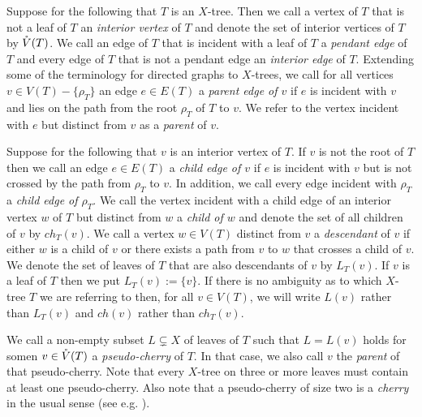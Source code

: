 Suppose for the following that $T$ is an $X$-tree. Then we call a vertex of
$T$ that is not a leaf of $T$ an {\em interior vertex} of $T$ and denote the
set of interior vertices of $T$ by $\mathring{V}(T)$.  We call an edge of $T$ that is
incident with a leaf of $T$ a {\em pendant edge} of $T$ and every edge of $T$
that is not a pendant edge an {\em interior edge} of $T$.  Extending some of
the terminology for directed graphs to $X$-trees, we call for all vertices
$v\in V(T)-\{\rho_T\}$ an edge $e\in E(T)$ a {\em parent edge of $v$} if $e$
is incident with $v$ and lies on the path from the root $\rho_T$ of $T$ to
$v$. We refer to the vertex incident with $e$ but distinct from $v$ as a {\em
  parent} of $v$.
 
Suppose for the following that $v$ is an interior vertex of $T$. If $v$ is not
the root of $T$ then we call an edge $e\in E(T)$ a {\em child edge of $v$} if
$e$ is incident with $v$ but is not crossed by the path from $\rho_T$ to $v$.
In addition, we call every edge incident with $\rho_T$ a {\em child edge of
  $\rho_T$}.  We call the vertex incident with a child edge of an interior
vertex $w$ of $T$ but distinct from $w$ a {\em child of $w$} and denote the
set of all children of $v$ by $ch_T(v)$.
We call a vertex $w\in V(T)$ distinct from $v$ a {\em descendant} of $v$ if
either $w$ is a child of $v$ or there exists a path from $v$ to $w$ that
crosses a child of $v$.  We denote the set of leaves of $T$ that are also
descendants of $v$ by $L_T(v)$. If $v$ is a leaf of $T$ then we put
$L_T(v):=\{v\}$. If there is no ambiguity as to which $X$-tree $T$ we are
referring to then, for all $v\in V(T)$, we will write $L(v)$ rather than
$L_T(v)$ and $ch(v)$ rather than $ch_T(v)$.

We call a non-empty subset $L\subsetneq X$ of leaves of $T$ such that $L=L(v)$
holds for somen $v\in \mathring{V}(T)$ a {\em pseudo-cherry} of $T$. In that case, we
also call $v$ the {\em parent} of that pseudo-cherry.
Note that every $X$-tree on three or more leaves must contain at least one
pseudo-cherry. Also note that a pseudo-cherry of size two is a {\em cherry} in
the usual sense (see e.g. \cite{semple2003phylogenetics}).

